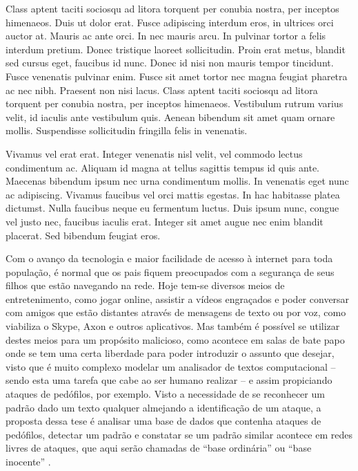 \documentclass[xindy,rascunho]{fei}
\begin{document}
\begin{agradecimentos}
Class aptent taciti sociosqu ad litora torquent per conubia nostra, per inceptos himenaeos. Duis ut dolor erat. Fusce adipiscing interdum eros, in ultrices orci auctor at. Mauris ac ante orci. In nec mauris arcu. In pulvinar tortor a felis interdum pretium. Donec tristique laoreet sollicitudin. Proin erat metus, blandit sed cursus eget, faucibus id nunc. Donec id nisi non mauris tempor tincidunt. Fusce venenatis pulvinar enim. Fusce sit amet tortor nec magna feugiat pharetra ac nec nibh. Praesent non nisi lacus. Class aptent taciti sociosqu ad litora torquent per conubia nostra, per inceptos himenaeos. Vestibulum rutrum varius velit, id iaculis ante vestibulum quis. Aenean bibendum sit amet quam ornare mollis. Suspendisse sollicitudin fringilla felis in venenatis.

Vivamus vel erat erat. Integer venenatis nisl velit, vel commodo lectus condimentum ac. Aliquam id magna at tellus sagittis tempus id quis ante. Maecenas bibendum ipsum nec urna condimentum mollis. In venenatis eget nunc ac adipiscing. Vivamus faucibus vel orci mattis egestas. In hac habitasse platea dictumst. Nulla faucibus neque eu fermentum luctus. Duis ipsum nunc, congue vel justo nec, faucibus iaculis erat. Integer sit amet augue nec enim blandit placerat. Sed bibendum feugiat eros.
\end{agradecimentos}

\begin{resumo}
Com o avanço da tecnologia e maior facilidade de acesso à internet para toda população, é normal que os pais fiquem preocupados com a segurança de seus filhos que estão navegando na rede. Hoje tem-se diversos meios de entretenimento, como jogar online, assistir a vídeos engraçados e poder conversar com amigos que estão distantes através de mensagens de texto ou por voz, como viabiliza o Skype, Axon e outros aplicativos. Mas também é possível se utilizar destes meios para um propósito malicioso, como acontece em salas de bate papo onde se tem uma certa liberdade para poder introduzir o assunto que desejar, visto que é muito complexo modelar um analisador de textos computacional – sendo esta uma tarefa que cabe ao ser humano realizar – e assim propiciando ataques de pedófilos, por exemplo.
 Visto a necessidade de se reconhecer um padrão dado um texto qualquer almejando a identificação de um ataque, a proposta dessa tese é analisar uma base de dados que contenha ataques de pedófilos, detectar um padrão e constatar se um padrão similar acontece em redes livres de ataques, que aqui serão chamadas de “base ordinária” ou “base inocente” .
 
\end{resumo}
\end{document}

